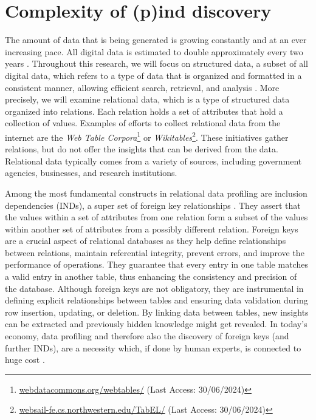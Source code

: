 \section{Complexity of (p)ind discovery}
The amount of data that is being generated is growing constantly and at an ever increasing pace. All digital data is estimated to double approximately every two years \cite{gantz2012digital}. Throughout this research, we will focus on structured data, a subset of all digital data, which refers to a type of data that is organized and formatted in a consistent manner, allowing efficient search, retrieval, and analysis \cite{gryz1998query}. More precisely, we will examine relational data, which is a type of structured data organized into relations. Each relation holds a set of attributes that hold a collection of values. Examples of efforts to collect relational data from the internet are the \textit{Web Table Corpora}\footnote{\href{https://webdatacommons.org/webtables/}{webdatacommons.org/webtables/} (Last Access: 30/06/2024)} or \textit{Wikitables}\footnote{\href{http://websail-fe.cs.northwestern.edu/TabEL/}{websail-fe.cs.northwestern.edu/TabEL/}  (Last Access: 30/06/2024)}. These initiatives gather relations, but do not offer the insights that can be derived from the data. Relational data typically comes from a variety of sources, including government agencies, businesses, and research institutions.

Among the most fundamental constructs in relational data profiling are inclusion dependencies (INDs), a super set of foreign key relationships \cite{casanova1982inclusion}. They assert that the values within a set of attributes from one relation form a subset of the values within another set of attributes from a possibly different relation. Foreign keys are a crucial aspect of relational databases as they help define relationships between relations, maintain referential integrity, prevent errors, and improve the performance of operations. They guarantee that every entry in one table matches a valid entry in another table, thus enhancing the consistency and precision of the database. Although foreign keys are not obligatory, they are instrumental in defining explicit relationships between tables and ensuring data validation during row insertion, updating, or deletion. By linking data between tables, new insights can be extracted and previously hidden knowledge might get revealed. In today's economy, data profiling and therefore also the discovery of foreign keys (and further INDs), are a necessity which, if done by human experts, is connected to huge cost \cite{halevy2006data}.\\

